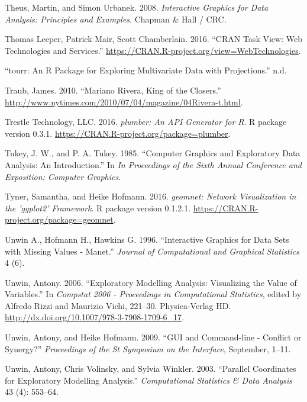 \documentclass[12pt,]{isuthesis}
\begin{document}
\hypertarget{ref-mondrianbook}{}
Theus, Martin, and Simon Urbanek. 2008. \emph{Interactive Graphics for
Data Analysis: Principles and Examples}. Chapman \& Hall / CRC.

\hypertarget{ref-WebServices}{}
Thomas Leeper, Patrick Mair, Scott Chamberlain. 2016. ``CRAN Task View:
Web Technologies and Services.''
\url{https://CRAN.R-project.org/view=WebTechnologies}.

\hypertarget{ref-tourr}{}
``tourr: An R Package for Exploring Multivariate Data with
Projections.'' n.d.

\hypertarget{ref-NYT}{}
Traub, James. 2010. ``Mariano Rivera, King of the Closers.''
\url{http://www.nytimes.com/2010/07/04/magazine/04Rivera-t.html}.

\hypertarget{ref-plumber}{}
Trestle Technology, LLC. 2016. \emph{plumber: An API Generator for R}. R
package version 0.3.1. \url{https://CRAN.R-project.org/package=plumber}.

\hypertarget{ref-scagnostics-tukey}{}
Tukey, J. W., and P. A. Tukey. 1985. ``Computer Graphics and Exploratory
Data Analysis: An Introduction.'' In \emph{In Proceedings of the Sixth
Annual Conference and Exposition: Computer Graphics}.

\hypertarget{ref-geomnet}{}
Tyner, Samantha, and Heike Hofmann. 2016. \emph{geomnet: Network
Visualization in the 'ggplot2' Framework}. R package version 0.1.2.1.
\url{https://CRAN.R-project.org/package=geomnet}.

\hypertarget{ref-MANET}{}
Unwin A., Hofmann H., Hawkins G. 1996. ``Interactive Graphics for Data
Sets with Missing Values - Manet.'' \emph{Journal of Computational and
Graphical Statistics} 4 (6).

\hypertarget{ref-Unwin:2006}{}
Unwin, Antony. 2006. ``Exploratory Modelling Analysis: Visualizing the
Value of Variables.'' In \emph{Compstat 2006 - Proceedings in
Computational Statistics}, edited by Alfredo Rizzi and Maurizio Vichi,
221--30. Physica-Verlag HD.
\url{http://dx.doi.org/10.1007/978-3-7908-1709-6_17}.

\hypertarget{ref-Unwin:1999vp}{}
Unwin, Antony, and Heike Hofmann. 2009. ``GUI and Command-line -
Conflict or Synergy?'' \emph{Proceedings of the St Symposium on the
Interface}, September, 1--11.

\hypertarget{ref-Unwin:2003uy}{}
Unwin, Antony, Chris Volinsky, and Sylvia Winkler. 2003. ``Parallel
Coordinates for Exploratory Modelling Analysis.'' \emph{Computational
Statistics \& Data Analysis} 43 (4): 553--64.
\end{document}
